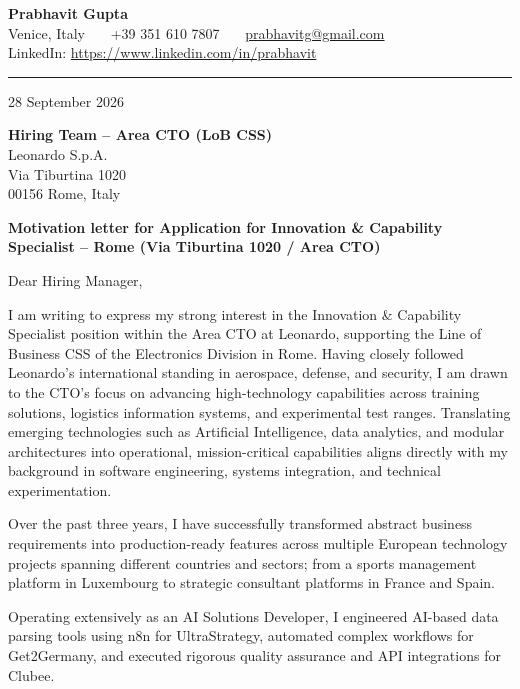 \documentclass[11pt,a4paper]{article}
\begin{document}
{\large\bfseries\color{primary} Prabhavit Gupta}\\[2pt]
Venice, Italy \ \textbullet\ \ +39 351 610 7807 \ \textbullet\ \ \href{mailto:prabhavitg@gmail.com}{prabhavitg@gmail.com}\\
LinkedIn: \href{https://www.linkedin.com/in/prabhavit}{https://www.linkedin.com/in/prabhavit}\\[-4pt]
{\color{linegray}\rule{\textwidth}{0.75pt}}

\vspace{10pt}

28 September 2026

\vspace{8pt}

\textbf{Hiring Team -- Area CTO (LoB CSS)}\\
Leonardo S.p.A.\\
Via Tiburtina 1020\\
00156 Rome, Italy

\vspace{10pt}

\textbf{Motivation letter for Application for Innovation \& Capability Specialist -- Rome (Via Tiburtina 1020 / Area CTO)}

\vspace{10pt}

Dear Hiring Manager,

I am writing to express my strong interest in the Innovation \& Capability Specialist position within the Area CTO at Leonardo, supporting the Line of Business CSS of the Electronics Division in Rome. Having closely followed Leonardo's international standing in aerospace, defense, and security, I am drawn to the CTO's focus on advancing high-technology capabilities across training solutions, logistics information systems, and experimental test ranges. Translating emerging technologies such as Artificial Intelligence, data analytics, and modular architectures into operational, mission-critical capabilities aligns directly with my background in software engineering, systems integration, and technical experimentation.

Over the past three years, I have successfully transformed abstract business requirements into production-ready features across multiple European technology projects spanning different countries and sectors; from a sports management platform in Luxembourg to strategic consultant platforms in France and Spain.

Operating extensively as an AI Solutions Developer, I engineered AI-based data parsing tools using n8n for UltraStrategy, automated complex workflows for Get2Germany, and executed rigorous quality assurance and API integrations for Clubee.
\end{document}
